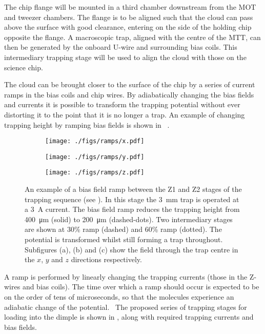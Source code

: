 The chip flange will be mounted in a third chamber downstream from the MOT and
tweezer chambers. The flange is to be aligned such that the cloud can pass above
the surface with good clearance, entering on the side of the holding chip opposite
the flange. A macroscopic trap, aligned with the centre of the MTT, can then be
generated by the onboard U-wire and surrounding bias coils. This intermediary
trapping stage will be used to align the cloud with those on the science chip.

The cloud can be brought closer to the surface of the chip by a series of
current ramps in the bias coils and chip wires. By adiabatically changing the
bias fields and currents it is possible to transform the trapping potential
without ever distorting it to the point that it is no longer a trap. An example
of changing trapping height by ramping bias fields is shown in
~. 

\begin{figure}[ht]
  \centering
  \begin{subfigure}{0.6\textwidth}
    \centering
    \texttt{[image: ./figs/ramps/x.pdf]}
    \caption{}
  \end{subfigure}
  \begin{subfigure}{0.6\textwidth}
    \centering
    \texttt{[image: ./figs/ramps/y.pdf]}
    \caption{}
  \end{subfigure}
  \begin{subfigure}{0.6\textwidth}
    \centering
    \texttt{[image: ./figs/ramps/z.pdf]}
    \caption{}
  \end{subfigure}
  \caption{
    An example of a bias field ramp between the Z1 and Z2 stages of the trapping
    sequence (see ). In this stage the
    \SI{3}{\milli\metre} trap is operated at a \SI{3}{\ampere} current. The bias
    field ramp reduces the trapping height from \SI{400}{\micro\metre} (solid)
    to \SI{200}{\micro\metre} (dashed-dots). Two intermediary stages are shown
    at 30\% ramp (dashed) and 60\% ramp (dotted). The potential is transformed
    whilst still forming a trap throughout. Subfigures (a), (b) and (c) show the
    field through the trap centre in the $x$, $y$ and $z$ directions
    respectively.
  }
  \label{experiment:fig:ramptraps}
\end{figure}

A ramp is performed by linearly changing the trapping currents (those in the
Z-wires and bias coils). The time over which a ramp should occur is expected to
be on the order of tens of microseconds, so that the molecules experience an
adiabatic change of the potential.~\cite{Boehi2009} The proposed series of
trapping stages for loading into the dimple is shown in
, along with required trapping currents and
bias fields.

